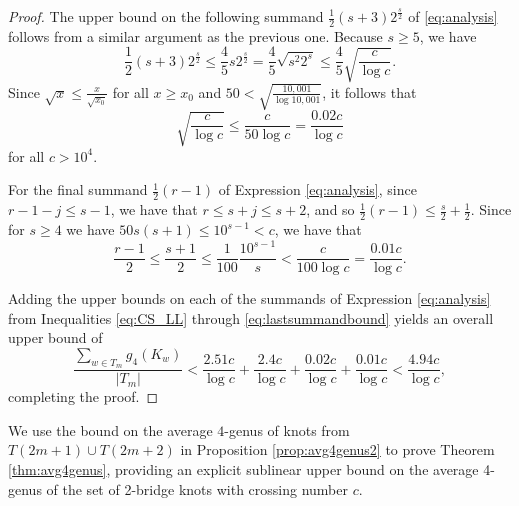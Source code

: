 \documentclass[12pt]{amsart}
\theoremstyle{definition}
\theoremstyle{remark}
\numberwithin{equation}{section}
\begin{document}
\begin{proof}
The upper bound on the following summand $\frac{1}{2}{(s+3)}2^{\frac{s}{2}}$ of \eqref{eq:analysis} follows from a similar argument as the previous one. Because $s\geq 5$, we have
\[\frac{1}{2}(s+3)2^{\frac{s}{2}} \leq \frac{4}{5} s 2^{\frac{s}{2}} = \frac{4}{5} \sqrt{s^2 2^s} \leq \frac{4}{5} \sqrt{\frac{c}{\log c}}.\]
Since $\sqrt{x}\leq \frac{x}{\sqrt{x_0}}$ for all $x\geq x_0$ and $50<\sqrt{\frac{10,001}{\log 10,001}}$, it follows that
\begin{equation}
\label{eq:atermbound}    
\sqrt{\frac{c}{\log c}} \leq \frac{c}{50\log c} = \frac{0.02c}{\log c}
\end{equation}
for all $c> 10^4$.

For the final summand $\frac{1}{2}{(r-1)}$ of Expression \eqref{eq:analysis}, since $r-1-j\leq s -1$, we have that $r\leq s+j \leq s+2$, and so $\frac{1}{2}(r-1)\leq \frac{s}{2}+\frac{1}{2}$.  Since for $s\geq 4$ we have $50s(s+1)\leq 10^{s-1} < c$, we have that
\begin{equation}
\label{eq:lastsummandbound}    
\frac{r-1}{2}\leq \frac{s+1}{2}\leq \frac{1}{100} \frac{10^{s-1}}{s} < \frac{c}{100\log c} = \frac{0.01c}{\log c}.
\end{equation}

Adding the upper bounds on each of the summands of Expression \eqref{eq:analysis} from Inequalities \eqref{eq:CS_LL} through \eqref{eq:lastsummandbound} yields an overall upper bound of
\[
\frac{\sum_{w\in T_m} g_4(K_w)}{|T_m|}< \frac{2.51c}{\log c}
+
\frac{2.4c}{\log c}
+
\frac{0.02c}{\log c}
+
\frac{0.01c}{\log c}
<
\frac{4.94c}{\log c},
\]
completing the proof.
\end{proof}

We use the bound on the average $4$-genus of knots from $T(2m+1)\cup T(2m+2)$ in Proposition \ref{prop:avg4genus2} to prove Theorem \ref{thm:avg4genus}, providing an explicit sublinear upper bound on the average 4-genus of the set of 2-bridge knots with crossing number $c$.

\iffalse
\end{document}
